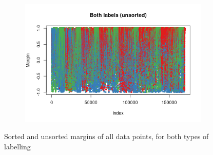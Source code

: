 \documentclass{l4proj}
\theoremstyle{definition}
\theoremstyle{remark}
\begin{document}
\begin{figure}
\begin{subfigure}[t]{0.49\textwidth}
    \includegraphics[width=\textwidth]{images/both_labels_margin2.png}
  \end{subfigure}
  \caption{Sorted and unsorted margins of all data points, for both types of
    labelling}
  \label{fig:margins}
\end{figure}
\end{document}
